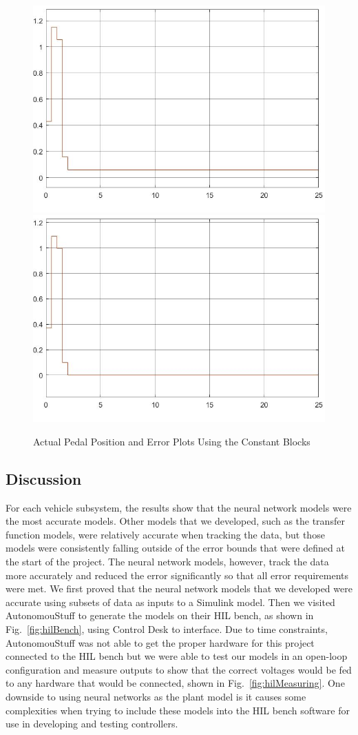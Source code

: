 \documentclass[journal,twoside,web]{ieeecolor}
\begin{document}
\begin{figure}[h]
	\centering
		{\includegraphics[width=0.48\linewidth]{figs/img/brakeSysActualPedalPositionConstantBlocks}}
		{\includegraphics[width=0.48\linewidth]{figs/img/brakeSysPedalPositionErrorConstantBlocks}}
	\caption{Actual Pedal Position and Error Plots Using the Constant Blocks}
\end{figure}

\subsection{Discussion}
\label{sec:discussion}

For each vehicle subsystem, the results show that the neural network models were the most accurate models. Other models that we developed, such as the transfer function models, were relatively accurate when tracking the data, but those models were consistently falling outside of the error bounds that were defined at the start of the project. The neural network models, however, track the data more accurately and reduced the error significantly so that all error requirements were met. We first proved that the neural network models that we developed were accurate using subsets of data as inputs to a Simulink model. Then we visited AutonomouStuff to generate the models on their HIL bench, as shown in Fig.~\ref{fig:hilBench}, using Control Desk to interface. Due to time constraints, AutonomouStuff was not able to get the proper hardware for this project connected to the HIL bench but we were able to test our models in an open-loop configuration and measure outputs to show that the correct voltages would be fed to any hardware that would be connected, shown in Fig.~\ref{fig:hilMeasuring}. One downside to using neural networks as the plant model is it causes some complexities when trying to include these models into the HIL bench software for use in developing and testing controllers. 
\end{document}
